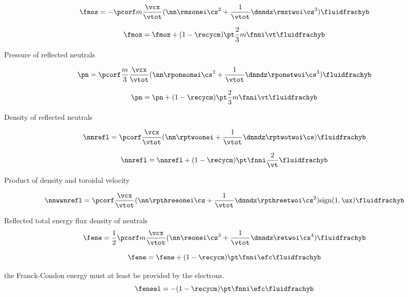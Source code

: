 \begin{equation}
    \fmoz = - \pcorf m \frac{\vcx}{\vtot} ( \nn \rmzonei \cs^2 + \frac{1}{\vtot} \dnndz \rmztwoi \cs^3) \fluidfrachyb
\end{equation}

\begin{equation}
    \fmoz =  \fmoz + (1-\recycm) \pt \frac{2}{3} m \fnni \vt \fluidfrachyb
\end{equation}

Pressure of reflected neutrals

\begin{equation}
    \pn = \pcorf \frac{m}{3} \frac{\vcx}{\vtot} (\nn \rponeonei \cs^2 + \frac{1}{\vtot} \dnndz \rponetwoi \cs^3) \fluidfrachyb
\end{equation}

\begin{equation}
    \pn = \pn + (1-\recycm) \pt \frac{2}{3} m \fnni \vt \fluidfrachyb
\end{equation}

Density of reflected neutrals

\begin{equation}
    \nnrefl = \pcorf \frac{\vcx}{\vtot} (\nn \rptwoonei + \frac{1}{\vtot} \dnndz \rptwotwoi \cs) \fluidfrachyb
\end{equation}

\begin{equation}
    \nnrefl = \nnrefl + (1-\recycm) \pt \fnni \frac{2}{\vt} \fluidfrachyb
\end{equation}

Product of density and toroidal velocity

\begin{equation}
    \nnwwnrefl = \pcorf \frac{\vcx}{\vtot} ( \nn \rpthreeonei \cs + \frac{1}{\vtot} \dnndz \rpthreetwoi \cs^2) \mathrm{sign}(1,\ux) \fluidfrachyb
\end{equation}

Reflected total energy flux density of neutrals
\begin{equation}
    \fene = \frac{1}{2} \pcorf m \frac{\vcx}{\vtot} (\nn \reonei \cs^3 + \frac{1}{\vtot} \dnndz \retwoi \cs^4) \fluidfrachyb
\end{equation}

\begin{equation}
    \fene = \fene + (1-\recycm) \pt \fnni \efc \fluidfrachyb
\end{equation}

the Franck-Condon energy must at least be provided by the electrons.
\begin{equation}
    \feneel = - (1-\recycm) \pt \fnni \efc \fluidfrachyb
\end{equation}

